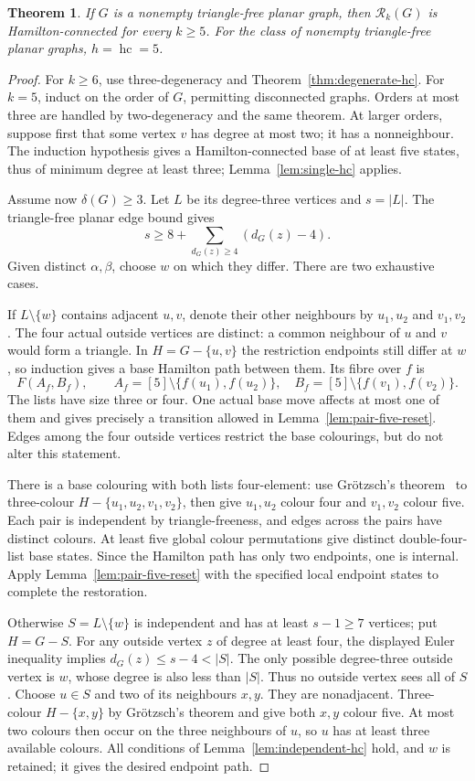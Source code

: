 \documentclass[11pt]{article}
\newtheorem{theorem}{Theorem}[section]
\theoremstyle{remark}
\newcommand{\Rk}{\mathcal R_k}
\newcommand{\hc}{\operatorname{hc}}
\numberwithin{equation}{section}
\numberwithin{table}{section}
\begin{document}
\begin{theorem}
\label{thm:trianglefree-hc}
If $G$ is a nonempty triangle-free planar graph, then $\Rk(G)$ is
Hamilton-connected for every $k\ge5$.  For the class of nonempty
triangle-free planar graphs,
$h=\hc=5$.
\end{theorem}

\begin{proof}
For $k\ge6$, use three-degeneracy and
Theorem~\ref{thm:degenerate-hc}.  For $k=5$, induct on the order of
$G$, permitting disconnected graphs.  Orders at most three are handled
by two-degeneracy and the same theorem.  At larger orders, suppose
first that some vertex $v$ has degree at most two; it has a nonneighbour.  The induction hypothesis
gives a Hamilton-connected base of at least five states, thus of minimum
degree at least three; Lemma~\ref{lem:single-hc} applies.

Assume now $\delta(G)\ge3$.  Let $L$ be its degree-three vertices
and $s=|L|$.  The triangle-free planar edge bound gives
\[
 s\ge8+\sum_{d_G(z)\ge4}(d_G(z)-4).
\]
Given distinct $\alpha,\beta$, choose $w$ on which they differ.
There are two exhaustive cases.

If $L\setminus\{w\}$ contains adjacent $u,v$, denote their other
neighbours by $u_1,u_2$ and $v_1,v_2$.  The four actual outside
vertices are distinct: a common neighbour of $u$ and $v$ would form
a triangle.  In $H=G-\{u,v\}$ the restriction endpoints still differ
at $w$, so induction gives a base Hamilton path between them.  Its
fibre over $f$ is
\[
 F(A_f,B_f),\qquad
 A_f=[5]\setminus\{f(u_1),f(u_2)\},\quad
 B_f=[5]\setminus\{f(v_1),f(v_2)\}.
\]
The lists have size three or four.  One actual base move affects at
most one of them and gives precisely a transition allowed in
Lemma~\ref{lem:pair-five-reset}.  Edges among the four outside
vertices restrict the base colourings, but do not alter this statement.

There is a base colouring with both lists four-element: use
Gr\"otzsch's theorem~\cite{Grotzsch59} to three-colour
$H-\{u_1,u_2,v_1,v_2\}$, then give $u_1,u_2$ colour four and
$v_1,v_2$ colour five.  Each pair is independent by triangle-freeness,
and edges across the pairs have distinct colours.  At least five global
colour permutations give distinct double-four-list base states.  Since
the Hamilton path has only two endpoints, one is internal.  Apply
Lemma~\ref{lem:pair-five-reset} with the specified local endpoint
states to complete the restoration.

Otherwise $S=L\setminus\{w\}$ is independent and has at least
$s-1\ge7$ vertices; put $H=G-S$.  For any outside vertex $z$ of degree at least
four, the displayed Euler inequality implies $d_G(z)\le s-4<|S|$.
The only possible degree-three outside vertex is $w$, whose degree is
also less than $|S|$.  Thus no outside vertex sees all of $S$.
Choose $u\in S$ and two of its neighbours $x,y$.  They are
nonadjacent.  Three-colour $H-\{x,y\}$ by Gr\"otzsch's theorem
and give both $x,y$ colour five.  At most two colours then occur on the
three neighbours of $u$, so $u$ has at least three available colours.
All conditions of Lemma~\ref{lem:independent-hc} hold, and $w$ is
retained; it gives the desired endpoint path.


\end{proof}
\end{document}

